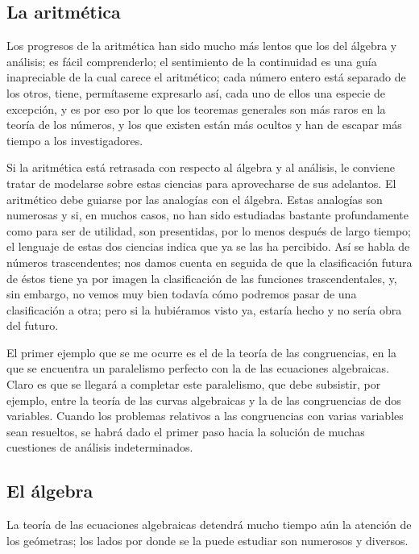 \documentclass[a4paper, 12pt]{article}
\begin{document}
\subsection*{La aritmética}


Los progresos de la aritmética han sido mucho más lentos que los del 
álgebra y análisis; es fácil comprenderlo; el sentimiento de
la continuidad es una guía inapreciable de la cual carece el aritmético; cada número entero está separado de los otros, tiene, permítaseme expresarlo así, cada uno de ellos una especie de excepción, y es por eso por lo que los teoremas generales son más raros en
la teoría de los números, y los que existen están más
ocultos y han de escapar más tiempo a los investigadores.

Si la aritmética está retrasada con respecto al álgebra y al análisis, le conviene tratar de modelarse sobre estas ciencias para
aprovecharse de sus adelantos. El aritmético debe guiarse por las analogías con el álgebra. Estas analogías son numerosas y si, en
muchos casos, no han sido estudiadas bastante profundamente como para ser de
utilidad, son presentidas, por lo menos después de largo tiempo; el
lenguaje de estas dos ciencias indica que ya se las ha percibido. Así
se habla de números trascendentes; nos damos cuenta en seguida de que
la clasificación futura de éstos tiene ya por imagen la clasificación de las funciones trascendentales, y, sin embargo, no vemos muy bien
todavía cómo podremos pasar de una clasificación a otra; pero
si la hubiéramos visto ya, estaría hecho y no sería obra del
futuro.

El primer ejemplo que se me ocurre es el de la teoría de las
congruencias, en la que se encuentra un paralelismo perfecto con la de las
ecuaciones algebraicas. Claro es que se llegará a completar este paralelismo, que
debe subsistir, por ejemplo, entre la teoría de las curvas algebraicas
y la de las congruencias de dos variables. Cuando los problemas relativos a las congruencias con varias variables sean
resueltos, se habrá dado el primer paso hacia la solución de muchas
cuestiones de análisis indeterminados.

 
\subsection*{El álgebra}

La teoría de las ecuaciones algebraicas detendrá mucho tiempo aún la atención de los geómetras; los lados por donde se la puede
estudiar son numerosos y diversos.
\end{document}
